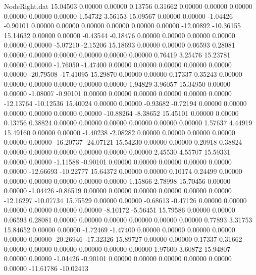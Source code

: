 \begin{filecontents}{NodeRight.dat}
  15.04503    0.00000    0.00000     0.13756    0.31662    0.00000    0.00000    0.00000    0.00000    0.00000    0.00000    1.54732    3.56153
  15.09567    0.00000    0.00000    -1.04426   -0.90101    0.00000    0.00000    0.00000    0.00000    0.00000    0.00000  -12.00892  -10.36155
  15.14632    0.00000    0.00000    -0.43544   -0.18476    0.00000    0.00000    0.00000    0.00000    0.00000    0.00000   -5.07210   -2.15206
  15.18693    0.00000    0.00000     0.06593    0.28081    0.00000    0.00000    0.00000    0.00000    0.00000    0.00000    0.76419    3.25476
  15.23781    0.00000    0.00000    -1.76050   -1.47400    0.00000    0.00000    0.00000    0.00000    0.00000    0.00000  -20.79508  -17.41095
  15.29870    0.00000    0.00000     0.17337    0.35243    0.00000    0.00000    0.00000    0.00000    0.00000    0.00000    1.94829    3.96057
  15.34950    0.00000    0.00000    -1.08007   -0.90101    0.00000    0.00000    0.00000    0.00000    0.00000    0.00000  -12.13764  -10.12536
  15.40024    0.00000    0.00000    -0.93682   -0.72194    0.00000    0.00000    0.00000    0.00000    0.00000    0.00000  -10.88264   -8.38652
  15.45101    0.00000    0.00000     0.13756    0.38824    0.00000    0.00000    0.00000    0.00000    0.00000    0.00000    1.57637    4.44919
  15.49160    0.00000    0.00000    -1.40238   -2.08282    0.00000    0.00000    0.00000    0.00000    0.00000    0.00000  -16.20737  -24.07121
  15.54230    0.00000    0.00000     0.20918    0.38824    0.00000    0.00000    0.00000    0.00000    0.00000    0.00000    2.45530    4.55707
  15.59331    0.00000    0.00000    -1.11588   -0.90101    0.00000    0.00000    0.00000    0.00000    0.00000    0.00000  -12.66693  -10.22777
  15.64372    0.00000    0.00000     0.10174    0.24499    0.00000    0.00000    0.00000    0.00000    0.00000    0.00000    1.15866    2.78998
  15.70456    0.00000    0.00000    -1.04426   -0.86519    0.00000    0.00000    0.00000    0.00000    0.00000    0.00000  -12.16297  -10.07734
  15.75529    0.00000    0.00000    -0.68613   -0.47126    0.00000    0.00000    0.00000    0.00000    0.00000    0.00000   -8.10172   -5.56451
  15.79586    0.00000    0.00000     0.06593    0.28081    0.00000    0.00000    0.00000    0.00000    0.00000    0.00000    0.77893    3.31753
  15.84652    0.00000    0.00000    -1.72469   -1.47400    0.00000    0.00000    0.00000    0.00000    0.00000    0.00000  -20.26946  -17.32326
  15.89727    0.00000    0.00000     0.17337    0.31662    0.00000    0.00000    0.00000    0.00000    0.00000    0.00000    1.97600    3.60872
  15.94807    0.00000    0.00000    -1.04426   -0.90101    0.00000    0.00000    0.00000    0.00000    0.00000    0.00000  -11.61786  -10.02413

\end{filecontents}
